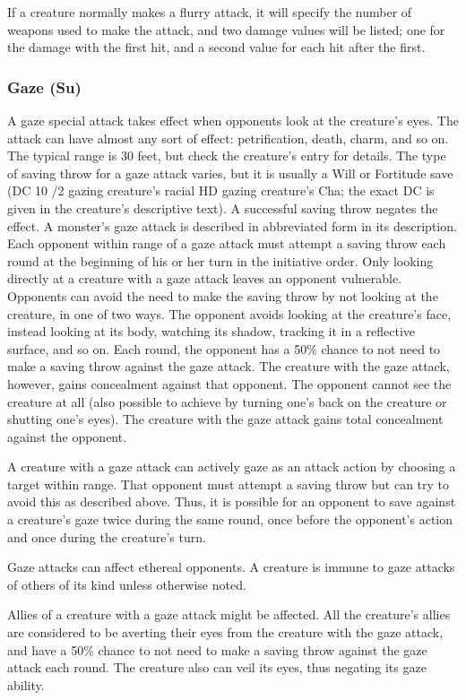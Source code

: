 If a creature normally makes a flurry attack, it will specify the number of weapons used to make the attack, and two damage values will be listed; one for the damage with the first hit, and a second value for each hit after the first.


\subsubsection{Gaze (Su)} A gaze special attack takes effect when opponents look at the creature's eyes. The attack can have almost any sort of effect: petrification, death, charm, and so on. The typical range is 30 feet, but check the creature's entry for details. The type of saving throw for a gaze attack varies, but it is usually a Will or Fortitude save (DC 10 /2 gazing creature's racial HD \add gazing creature's Cha; the exact DC is given in the creature's descriptive text). A successful saving throw negates the effect. A monster's gaze attack is described in abbreviated form in its description. Each opponent within range of a gaze attack must attempt a saving throw each round at the beginning of his or her turn in the initiative order. Only looking directly at a creature with a gaze attack leaves an opponent vulnerable. Opponents can avoid the need to make the saving throw by not looking at the creature, in one of two ways. 
 The opponent avoids looking at the creature's face, instead looking at its body, watching its shadow, tracking it in a reflective surface, and so on. Each round, the opponent has a 50\% chance to not need to make a saving throw against the gaze attack. The creature with the gaze attack, however, gains concealment against that opponent.
 The opponent cannot see the creature at all (also possible to achieve by turning one's back on the creature or shutting one's eyes). The creature with the gaze attack gains total concealment against the opponent. 
\par A creature with a gaze attack can actively gaze as an attack action by choosing a target within range. That opponent must attempt a saving throw but can try to avoid this as described above. Thus, it is possible for an opponent to save against a creature's gaze twice during the same round, once before the opponent's action and once during the creature's turn. 
\par Gaze attacks can affect ethereal opponents. A creature is immune to gaze attacks of others of its kind unless otherwise noted.
\par Allies of a creature with a gaze attack might be affected. All the creature's allies are considered to be averting their eyes from the creature with the gaze attack, and have a 50\% chance to not need to make a saving throw against the gaze attack each round. The creature also can veil its eyes, thus negating its gaze ability.

